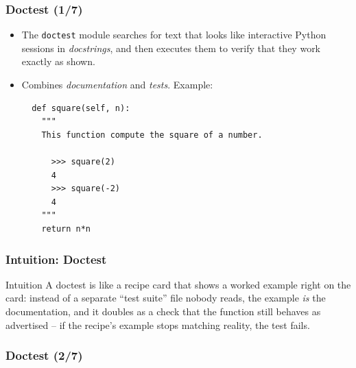 \begin{frame}[fragile]\frametitle{Doctest (1/7)}

  \begin{itemize}
  \item[$\triangleright$] The \texttt{doctest} module searches for text that looks like
  interactive Python sessions in \textit{docstrings}, and then
  executes them to verify that they work exactly as shown.

  \item[$\triangleright$] 
  Combines \textit{documentation} and \textit{tests}. Example:
  \begin{lstlisting}
  def square(self, n):
    """
    This function compute the square of a number.

      >>> square(2)
      4
      >>> square(-2)
      4
    """
    return n*n
  \end{lstlisting}
    \end{itemize}
\end{frame}

\begin{frame}[fragile]\frametitle{Intuition: Doctest}
\begin{block}{Intuition}
A doctest is like a recipe card that shows a worked example right on the card: instead of a
separate ``test suite'' file nobody reads, the example \emph{is} the documentation, and it
doubles as a check that the function still behaves as advertised -- if the recipe's example
stops matching reality, the test fails.
\end{block}
\end{frame}


\begin{frame}[fragile]\frametitle{Doctest (2/7)}

\hfill
{}

\end{frame}

